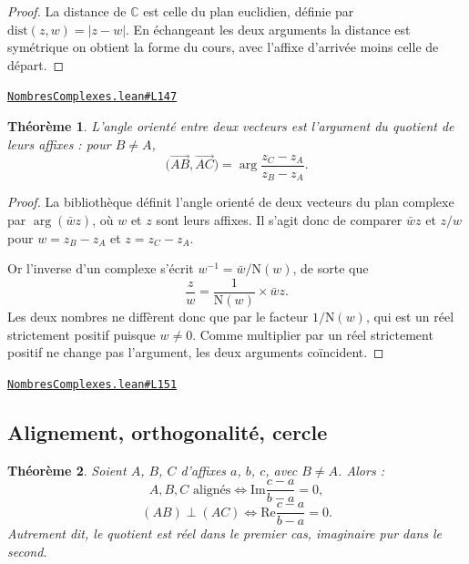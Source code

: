 \documentclass[11pt,a4paper]{article}
\theoremstyle{definition}
\theoremstyle{plain}
\newtheorem{theoreme}{Théorème}
\newcommand{\source}[2]{\par\smallskip\noindent\hfill{\footnotesize\href{#1}{\texttt{#2}}}\par\smallskip}
\begin{document}
\begin{proof}
La distance de $\mathbb{C}$ est celle du plan euclidien, définie par
$\mathrm{dist}(z, w) = |z - w|$. En échangeant les deux arguments \textemdash{} la
distance est symétrique \textemdash{} on obtient la forme du cours, avec l'affixe
d'arrivée moins celle de départ.
\end{proof}
\source{https://github.com/Commutator-IO/learn-lean/blob/main/cours/02-lycee/07-nombres-complexes/NombresComplexes.lean\#L147}{NombresComplexes.lean\#L147}

\begin{theoreme}
L'angle orienté entre deux vecteurs est l'argument du quotient de leurs affixes : pour
$B \ne A$,
\[ \bigl(\overrightarrow{AB}, \overrightarrow{AC}\bigr)
   = \arg\frac{z_C - z_A}{z_B - z_A} . \]
\end{theoreme}

\begin{proof}
La bibliothèque définit l'angle orienté de deux vecteurs du plan complexe par
$\arg(\bar w z)$, où $w$ et $z$ sont leurs affixes. Il s'agit donc de comparer $\bar w z$
et $z/w$ pour $w = z_B - z_A$ et $z = z_C - z_A$.

Or l'inverse d'un complexe s'écrit $w^{-1} = \bar w / \mathrm{N}(w)$, de sorte que
\[ \frac{z}{w} = \frac{1}{\mathrm{N}(w)} \times \bar w z . \]
Les deux nombres ne diffèrent donc que par le facteur $1/\mathrm{N}(w)$, qui est un réel
strictement positif puisque $w \ne 0$. Comme multiplier par un réel strictement positif ne
change pas l'argument, les deux arguments coïncident.
\end{proof}
\source{https://github.com/Commutator-IO/learn-lean/blob/main/cours/02-lycee/07-nombres-complexes/NombresComplexes.lean\#L151}{NombresComplexes.lean\#L151}

\subsection{Alignement, orthogonalité, cercle}

\begin{theoreme}
Soient $A$, $B$, $C$ d'affixes $a$, $b$, $c$, avec $B \ne A$. Alors :
\[ A, B, C \text{ alignés} \iff \mathrm{Im}\frac{c - a}{b - a} = 0 , \]
\[ (AB) \perp (AC) \iff \mathrm{Re}\frac{c - a}{b - a} = 0 . \]
Autrement dit, le quotient est réel dans le premier cas, imaginaire pur dans le second.
\end{theoreme}
\end{document}
